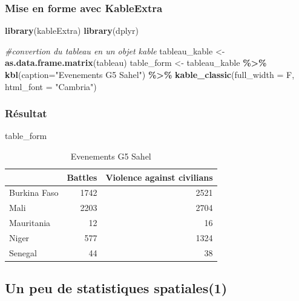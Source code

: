 \documentclass[
  12pt,
]{article}
\newenvironment{Shaded}{\begin{snugshade}}{\end{snugshade}}
\newcommand{\AttributeTok}[1]{\textcolor[rgb]{0.13,0.29,0.53}{#1}}
\newcommand{\CommentTok}[1]{\textcolor[rgb]{0.56,0.35,0.01}{\textit{#1}}}
\newcommand{\FunctionTok}[1]{\textcolor[rgb]{0.13,0.29,0.53}{\textbf{#1}}}
\newcommand{\NormalTok}[1]{#1}
\newcommand{\OtherTok}[1]{\textcolor[rgb]{0.56,0.35,0.01}{#1}}
\newcommand{\SpecialCharTok}[1]{\textcolor[rgb]{0.81,0.36,0.00}{\textbf{#1}}}
\newcommand{\StringTok}[1]{\textcolor[rgb]{0.31,0.60,0.02}{#1}}
\begin{document}
\subsubsection{Mise en forme avec
KableExtra}\label{mise-en-forme-avec-kableextra}

\begin{Shaded}
\begin{Highlighting}[]
\FunctionTok{library}\NormalTok{(kableExtra)}
\FunctionTok{library}\NormalTok{(dplyr)}

\CommentTok{\#convertion du tableau en un objet kable}
\NormalTok{tableau\_kable }\OtherTok{\textless{}{-}} \FunctionTok{as.data.frame.matrix}\NormalTok{(tableau) }
\NormalTok{table\_form }\OtherTok{\textless{}{-}}\NormalTok{ tableau\_kable }\SpecialCharTok{\%\textgreater{}\%}
  \FunctionTok{kbl}\NormalTok{(}\AttributeTok{caption=}\StringTok{"Evenements G5 Sahel"}\NormalTok{) }\SpecialCharTok{\%\textgreater{}\%}
  \FunctionTok{kable\_classic}\NormalTok{(}\AttributeTok{full\_width =}\NormalTok{ F, }\AttributeTok{html\_font =} \StringTok{"Cambria"}\NormalTok{)}
\end{Highlighting}
\end{Shaded}

\subsubsection{Résultat}\label{ruxe9sultat-1}

\begin{Shaded}
\begin{Highlighting}[]
\NormalTok{table\_form}
\end{Highlighting}
\end{Shaded}

\begin{table}
\centering
\caption{\label{tab:unnamed-chunk-32}Evenements G5 Sahel}
\centering
\begin{tabular}[t]{l|r|r}
\hline
  & Battles & Violence against civilians\\
\hline
Burkina Faso & 1742 & 2521\\
\hline
Mali & 2203 & 2704\\
\hline
Mauritania & 12 & 16\\
\hline
Niger & 577 & 1324\\
\hline
Senegal & 44 & 38\\
\hline
\end{tabular}
\end{table}

\subsection{Un peu de statistiques
spatiales(1)}\label{un-peu-de-statistiques-spatiales1}
\end{document}
